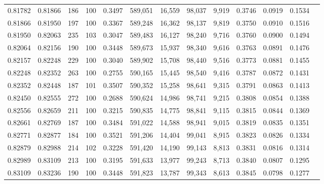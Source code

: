 \begin{tabular}{rrrrrrrrrrrrr}
0.81782 & 0.81866 &   186 & 100 &                                     0.3497 & 589,051 &  16,559 &  98,037 &   9,919 & 0.3746 & 0.0919 & 0.1534 \\
0.81866 & 0.81950 &   197 & 100 &                                     0.3367 & 589,248 &  16,362 &  98,137 &   9,819 & 0.3750 & 0.0910 & 0.1516 \\
0.81950 & 0.82063 &   235 & 103 &                                     0.3047 & 589,483 &  16,127 &  98,240 &   9,716 & 0.3760 & 0.0900 & 0.1494 \\
0.82064 & 0.82156 &   190 & 100 &                                     0.3448 & 589,673 &  15,937 &  98,340 &   9,616 & 0.3763 & 0.0891 & 0.1476 \\
0.82157 & 0.82248 &   229 & 100 &                                     0.3040 & 589,902 &  15,708 &  98,440 &   9,516 & 0.3773 & 0.0881 & 0.1455 \\
0.82248 & 0.82352 &   263 & 100 &                                     0.2755 & 590,165 &  15,445 &  98,540 &   9,416 & 0.3787 & 0.0872 & 0.1431 \\
0.82352 & 0.82448 &   187 & 101 &                                     0.3507 & 590,352 &  15,258 &  98,641 &   9,315 & 0.3791 & 0.0863 & 0.1413 \\
0.82450 & 0.82555 &   272 & 100 &                                     0.2688 & 590,624 &  14,986 &  98,741 &   9,215 & 0.3808 & 0.0854 & 0.1388 \\
0.82556 & 0.82659 &   211 & 100 &                                     0.3215 & 590,835 &  14,775 &  98,841 &   9,115 & 0.3815 & 0.0844 & 0.1369 \\
0.82661 & 0.82769 &   187 & 100 &                                     0.3484 & 591,022 &  14,588 &  98,941 &   9,015 & 0.3819 & 0.0835 & 0.1351 \\
0.82771 & 0.82877 &   184 & 100 &                                     0.3521 & 591,206 &  14,404 &  99,041 &   8,915 & 0.3823 & 0.0826 & 0.1334 \\
0.82879 & 0.82988 &   214 & 102 &                                     0.3228 & 591,420 &  14,190 &  99,143 &   8,813 & 0.3831 & 0.0816 & 0.1314 \\
0.82989 & 0.83109 &   213 & 100 &                                     0.3195 & 591,633 &  13,977 &  99,243 &   8,713 & 0.3840 & 0.0807 & 0.1295 \\
0.83109 & 0.83236 &   190 & 100 &                                     0.3448 & 591,823 &  13,787 &  99,343 &   8,613 & 0.3845 & 0.0798 & 0.1277 \\

\end{tabular}
